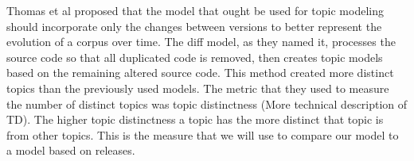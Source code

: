 Thomas et al proposed that the model that ought be used for topic modeling should incorporate only the changes between versions \cite{Thomas2011} to better represent the evolution of a corpus over time.
The diff model, as they named it, processes the source code so that all duplicated code is removed, then creates topic models based on the remaining altered source code.
This method created more distinct topics than the previously used models.
The metric that they used to measure the number of distinct topics was topic distinctness (More technical description of TD).
The higher topic distinctness a topic has the more distinct that topic is from other topics.
This is the measure that we will use to compare our model to a model based on releases.

\begin{comment}
Software source code is often compiled through a series of commits that change the source code between releases.
These commits can be of many sizes from a small change in a function to additions of many functions.
The person who commits these changes is seen as being the owner of the code \cite{Corley2012}.
The owner of the code is assumed to have a greater working knowledge of the code in question than other members of the design team.
Being able to determine who would know most about a certain topic would allow someone working on a design team to know who is best fit to solve an issue pertaining to a certain topic.
Unfortunately, most of the topic modeling that is currently used to determine ownership is only based off of larger releases rather than intermediate changes.
These types of topic models can be problematic if you are working between releases.
Think for a second that you are a project manager at a software company with a rapidly approaching release deadline.
There is a problem of some sort with the code, and through the use of a topic model you could be able to identify precisely who should be delegated the task of fixing it.
With the type of dynamic topic model like we are proposing, this is easily attainable.
A model based on the change sets between commits would allow software developers never to have an obsolete model.
While there has been some research in the use of commit log comments \cite{Hindle2009}, we are not aware of any analyses of topic models that have been created by using the differences of the source code between commits.
\end{comment}
